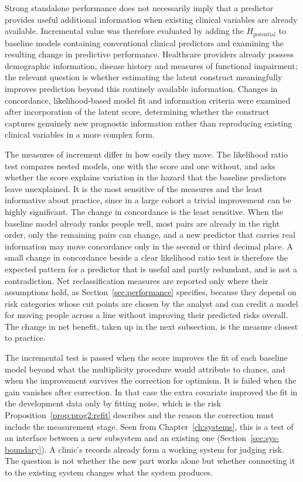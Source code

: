 Strong standalone performance does not necessarily imply that a predictor provides useful additional information when existing clinical variables are already available. Incremental value was therefore evaluated by adding the $H_{\text{potential}}$ to baseline models containing conventional clinical predictors and examining the resulting change in predictive performance. Healthcare providers already possess demographic information, disease history and measures of functional impairment; the relevant question is whether estimating the latent construct meaningfully improves prediction beyond this routinely available information. Changes in concordance, likelihood-based model fit and information criteria were examined after incorporation of the latent score, determining whether the construct captures genuinely new prognostic information rather than reproducing existing clinical variables in a more complex form.

The measures of increment differ in how easily they move. The likelihood ratio test compares nested models, one with the score and one without, and asks whether the score explains variation in the hazard that the baseline predictors leave unexplained. It is the most sensitive of the measures and the least informative about practice, since in a large cohort a trivial improvement can be highly significant. The change in concordance is the least sensitive. When the baseline model already ranks people well, most pairs are already in the right order, only the remaining pairs can change, and a new predictor that carries real information may move concordance only in the second or third decimal place. A small change in concordance beside a clear likelihood ratio test is therefore the expected pattern for a predictor that is useful and partly redundant, and is not a contradiction. Net reclassification measures are reported only where their assumptions hold, as Section~\ref{sec:performance} specifies, because they depend on risk categories whose cut points are chosen by the analyst and can credit a model for moving people across a line without improving their predicted risks overall. The change in net benefit, taken up in the next subsection, is the measure closest to practice.

The incremental test is passed when the score improves the fit of each baseline model beyond what the multiplicity procedure would attribute to chance, and when the improvement survives the correction for optimism. It is failed when the gain vanishes after correction. In that case the extra covariate improved the fit in the development data only by fitting noise, which is the risk Proposition~\ref{prop:prog2:refit} describes and the reason the correction must include the measurement stage. Seen from Chapter~\ref{ch:systems}, this is a test of an interface between a new subsystem and an existing one (Section~\ref{sec:sys-boundary}). A clinic's records already form a working system for judging risk. The question is not whether the new part works alone but whether connecting it to the existing system changes what the system produces.

